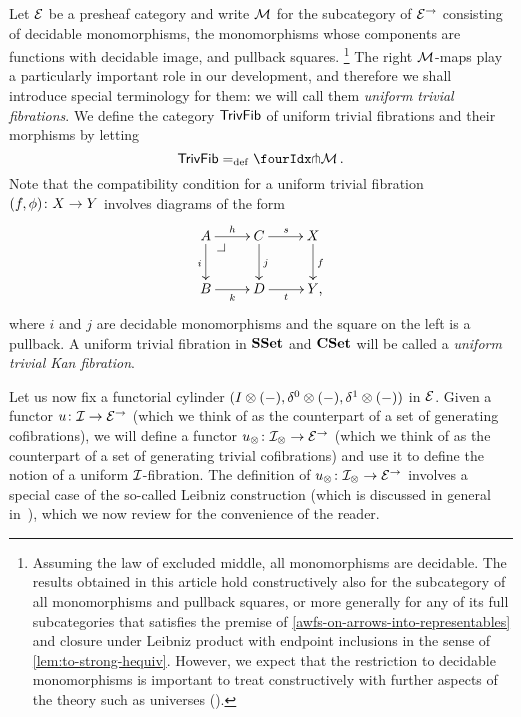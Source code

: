 \documentclass[reqno,10pt,a4paper,oneside,draft]{amsart}
\begin{document}
\begin{example} \label{exa-triv-kan-fib}
Let $\catE$ be a presheaf category and write $\cal{M}$ for the subcategory of $\catE^\to$ consisting of decidable monomorphisms, \ie the monomorphisms whose components are functions with decidable image, and pullback squares.%
\footnote{
Assuming the law of excluded middle, all monomorphisms are decidable. 
The results obtained in this article hold constructively also for the subcategory of all monomorphisms and pullback squares, or more generally for any of its full subcategories that satisfies the premise of \cref{awfs-on-arrows-into-representables} and closure under Leibniz product with endpoint inclusions in the sense of \cref{lem:to-strong-hequiv}.
However, we expect that the restriction to decidable monomorphisms is important to treat constructively with further aspects of the theory such as universes (\cf \cite{coquand-face}).
}
The right $\cal{M}$-maps play a particularly important role in our development, and therefore we shall introduce special terminology for them: we will call them \emph{uniform trivial fibrations}.
We define the category $\TrivFib$ of uniform trivial fibrations and their morphisms by letting
\[
 \TrivFib \defeq \liftr{\cal{M}} \, .
\]
Note that the compatibility condition for a uniform trivial fibration $(f, \phi) \co X \to Y$ involves diagrams of the form
\[
\xymatrix{
  A
  \ar[r]^{h}
  \ar[d]_{i}
  \pullback{dr}
&
  C \ar[d]^{j}
  \ar[r]^{s}
&
  X \ar[d]^f
\\
  B
  \ar[r]_{k}
&
  D \ar[r]_{t}
&
  Y
\rlap{,}}
\]
where $i$ and $j$ are decidable monomorphisms and the square on the left is a pullback.
A uniform trivial fibration in $\SSet$ and $\CSet$ will be called a \emph{uniform trivial Kan fibration}.
\end{example}

Let us now fix a functorial cylinder $(\interval \otimes (-), \lcyl \otimes (-), \rcyl \otimes (-))$ in $\calE$.
Given a functor $u \co \cal{I} \to \catE^\to$ (which we think of as the counterpart of a set of generating cofibrations), we will define a functor $u_\otimes \co \cal{I}_\otimes \to \catE^\to$ (which we think of as the counterpart of a set of generating trivial cofibrations) and use it to define the notion of a uniform $\cal{I}$-fibration.
The definition of $u_\otimes \co \cal{I}_\otimes \to \catE^\to$ involves a special case of the so-called Leibniz construction (which is discussed in general in~\cite{riehl-verity:reedy}), which we now review for the convenience of the reader.
\end{document}
